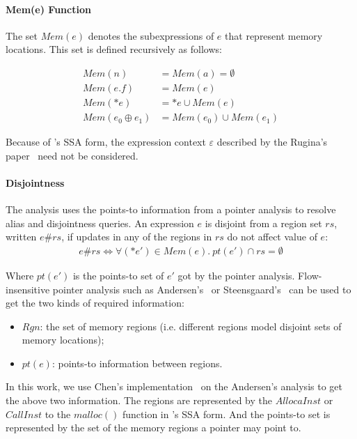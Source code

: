 \paragraph{Mem(e) Function} 

The set $Mem(e)$ denotes the subexpressions of $e$ that represent memory 
locations. This set is defined recursively as follows:

\begin{align*}
  Mem(n) &= Mem(a)=\emptyset \\
Mem(e.f) &= Mem(e) \\
 Mem(*e) &={*e}\cup Mem(e) \\
Mem(e_0 \oplus e_1) &= Mem(e_0)\cup Mem(e_1)
\end{align*}


Because of \llvm's SSA form, the expression context $\varepsilon$ described 
by the Rugina's paper~\cite{rugina} need not be considered.

\paragraph{Disjointness}

The analysis uses the points-to information from a pointer analysis 
to resolve alias and disjointness queries. 
An expression $e$ is disjoint from a region set 
$rs$, written $e\#rs$, if updates in any of the regions in $rs$ do not 
affect value of $e$:
\begin{align*}
e\#rs \iff \forall(*e')\in Mem(e). \ pt(e')\cap rs=\emptyset
\end{align*}

Where $pt(e')$ is the points-to set of $e'$ got by the pointer analysis. 
Flow-insensitive pointer analysis such as Andersen's~\cite{andersen} or 
Steensgaard's~\cite{steensgaard} can be used to get the two kinds of 
required information:

\begin{itemize}
  \item $Rgn$: the set of memory regions 
    (i.e. different regions model disjoint sets of memory locations);
  \item $pt(e)$: points-to information between regions.
\end{itemize}

In this work, we use Chen's implementation~\cite{chen} on the Andersen's 
analysis to get the above two information.
The regions are represented by the $AllocaInst$ or $CallInst$ to the $malloc()$ 
function in \llvm's SSA form. And the points-to set is represented by the 
set of the memory regions a pointer may point to.


